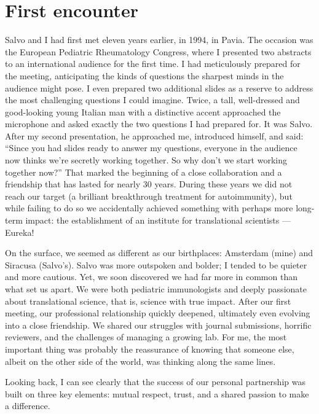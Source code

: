 \documentclass[authordate, editorial, issue]{jote-new-article}
\begin{document}
	\section{First encounter}



	Salvo and I had first met eleven years earlier, in 1994, in Pavia. The occasion was the European Pediatric Rheumatology Congress, where I presented two abstracts to an international audience for the first time. I had meticulously prepared for the meeting, anticipating the kinds of questions the sharpest minds in the audience might pose. I even prepared two additional slides as a reserve to address the most challenging questions I could imagine. Twice, a tall, well-dressed and good-looking young Italian man with a distinctive accent approached the microphone and asked exactly the two questions I had prepared for. It was Salvo. After my second presentation, he approached me, introduced himself, and said: “Since you had slides ready to answer my questions, everyone in the audience now thinks we're secretly working together. So why don't we start working together now?” That marked the beginning of a close collaboration and a friendship that has lasted for nearly 30 years. During these years we did not reach our target (a brilliant breakthrough treatment for autoimmunity), but while failing to do so we accidentally achieved something with perhaps more long-term impact: the establishment of an institute for translational scientists — Eureka!







	On the surface, we seemed as different as our birthplaces: Amsterdam (mine) and Siracusa (Salvo's). Salvo was more outspoken and bolder; I tended to be quieter and more cautious. Yet, we soon discovered we had far more in common than what set us apart. We were both pediatric immunologists and deeply passionate about translational science, that is, science with true impact. After our first meeting, our professional relationship quickly deepened, ultimately even evolving into a close friendship. We shared our struggles with journal submissions, horrific reviewers, and the challenges of managing a growing lab. For me, the most important thing was probably the reassurance of knowing that someone else, albeit on the other side of the world, was thinking along the same lines.



	Looking back, I can see clearly that the success of our personal partnership was built on three key elements: mutual respect, trust, and a shared passion to make a difference.
\end{document}
